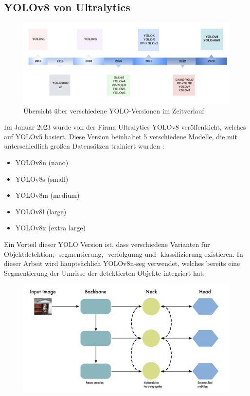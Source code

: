 {	\subsection{YOLOv8 von Ultralytics}{ \label{subsec:YOLOv8_theoretic}
	\begin{figure}[h]
		\centering
		\includegraphics*[scale = 0.15, keepaspectratio]{images/YOLO/YOLO_timeline_vers.png}
		\caption[Übersicht über verschiedene YOLO Versionen im Zeitverlauf]{Übersicht über verschiedene YOLO-Versionen im Zeitverlauf \citep{Terven2023}}
		\label{YOLO_timeline_vers}
		\end{figure}
	Im Januar 2023 wurde von der Firma Ultralytics YOLOv8 veröffentlicht, welches auf YOLOv5 basiert. Diese Version beinhaltet 5 verschiedene Modelle, die mit unterschiedlich großen Datensätzen trainiert wurden  \citep{Terven2023}: 
	\begin{itemize}
		\item YOLOv8n (nano)
		\item YOLOv8s (small)
		\item YOLOv8m (medium)
		\item YOLOv8l (large)
		\item YOLOv8x (extra large)
	\end{itemize}
	Ein Vorteil dieser YOLO Version ist, dass verschiedene Varianten für Objektdetektion, -segmentierung, -verfolgunng und -klassifizierung existieren. In dieser Arbeit wird hauptsächlich YOLOv8n-seg verwendet, welches bereits eine Segmentierung der Umrisse der detektierten Objekte integriert hat.
	\begin{figure}[h]
		\centering
		\includegraphics*[scale = 0.25, keepaspectratio]{images/YOLO/YOLOv8_object_detector_general.png}

\end{figure}}}
